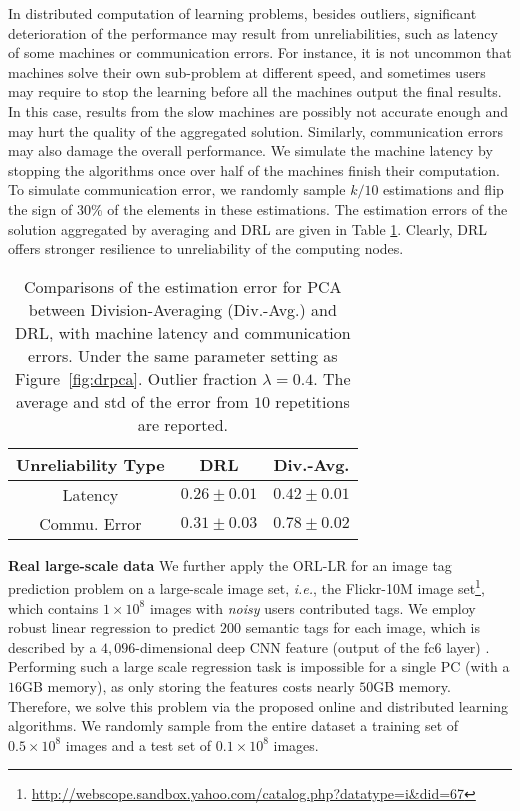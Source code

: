 \documentclass[11pt]{article}
\begin{document}
In distributed computation of learning problems, besides outliers, significant deterioration of the performance may result from unreliabilities, such as  latency of some machines or  communication errors. For instance, it is not uncommon that machines solve their own sub-problem at different speed, and sometimes users may require to stop the learning before all the machines output the final results. In this case, results from the slow machines are possibly not accurate enough and may hurt the quality of the aggregated solution. Similarly, communication errors may also damage the overall performance. We simulate the machine latency by stopping the algorithms once over half of the machines finish their computation. To simulate communication error, we randomly sample $ k/10 $ estimations and flip the sign of $ 30\% $ of the elements in these estimations. The estimation errors of the solution aggregated by averaging and DRL are given in Table \ref{tab:avg-compare}. Clearly, DRL offers stronger resilience to unreliability of the computing nodes.

\begin{table}
	\caption{Comparisons of the estimation error for PCA between Division-Averaging (Div.-Avg.) and DRL, with machine latency and communication errors. Under the same parameter setting as Figure~\ref{fig:drpca}. Outlier fraction $ \lambda = 0.4 $. The average and std of the error from $ 10 $ repetitions are reported.}
	\label{tab:avg-compare}
	\centering
	\begin{tabular}{c|c|c}
		Unreliability Type  & DRL & Div.-Avg. \\
		\hline
		Latency & $ 0.26 \pm 0.01 $ & $ 0.42 \pm 0.01 $  \\
		\hline
		Commu. Error &$ 0.31 \pm 0.03 $  & $ 0.78 \pm 0.02  $   \\
	\end{tabular}
	\vspace{-4mm}
\end{table}



\textbf{Real large-scale data} We further apply the ORL-LR   for an image tag prediction problem on a large-scale image set, \emph{i.e.}, the Flickr-10M image set\footnote{\url{http://webscope.sandbox.yahoo.com/catalog.php?datatype=i&did=67}}, which contains  $ 1 \times 10^8 $ images with \emph{noisy} users contributed tags. We employ robust linear regression to predict $ 200 $ semantic tags for each image, which is described by a  $ 4{,}096$-dimensional deep CNN  feature (output of the fc6 layer) \cite{jia2014caffe}. Performing such a large scale regression task is  impossible for a single PC (with a  $ 16 $GB memory), as only storing the features costs nearly $ 50 $GB memory. Therefore, we solve this problem via the proposed online and distributed learning algorithms. We randomly sample from the entire dataset  a training set of $ 0.5\times 10^8 $ images and a test set of $ 0.1\times 10^8 $ images.
\end{document}
